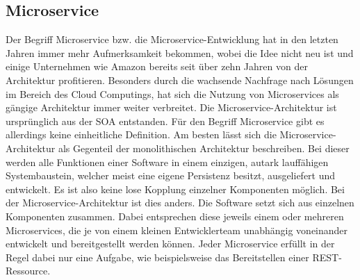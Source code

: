 \subsection{Microservice}\label{ch:microservice}

Der Begriff Microservice bzw. die Microservice-Entwicklung hat in den letzten Jahren immer mehr Aufmerksamkeit bekommen,\autocite[Vgl.][Kapitel \enquote{Monolithic architecture overview}]{MS-Sharma.2016} wobei die Idee nicht neu ist und einige Unternehmen wie Amazon bereits seit über zehn Jahren von der Architektur profitieren.\autocite[Vgl.][]{MS-Wolff.02.11.2015} 
Besonders durch die wachsende Nachfrage nach Lösungen im Bereich des Cloud Computings\autocite[Vgl.][]{MS-Herrmann.10.02.2017}, hat sich die Nutzung von Microservices als gängige Architektur immer weiter verbreitet. 
Die Microservice-Architektur ist ursprünglich aus der \acs{SOA} entstanden.\autocite[Vgl.][S. 1]{MS-Bucchiarone.2018} 
Für den Begriff Microservice gibt es allerdings keine einheitliche Definition\autocite[Vgl.][S. 3]{MS-Wolff.2018}. 
Am besten lässt sich die Microservice-Architektur als Gegenteil der monolithischen Architektur beschreiben. 
Bei dieser werden alle Funktionen einer Software in einem einzigen, autark lauffähigen Systembaustein, welcher meist eine eigene Persistenz besitzt, ausgeliefert und entwickelt. 
Es ist also keine lose Kopplung einzelner Komponenten möglich.\autocite[Vgl.][S. 216]{MS-Vogel.2009} 
Bei der Microservice-Architektur ist dies anders.
Die Software setzt sich aus einzelnen Komponenten zusammen. 
Dabei entsprechen diese jeweils einem oder mehreren Microservices, die je von einem kleinen Entwicklerteam unabhängig voneinander entwickelt und bereitgestellt werden können.\autocite[Vgl.][]{MS-Fowler.25.03.2014} 
Jeder Microservice erfüllt in der Regel dabei nur eine Aufgabe, wie beispielsweise das Bereitstellen einer \ac{REST}-Ressource.
